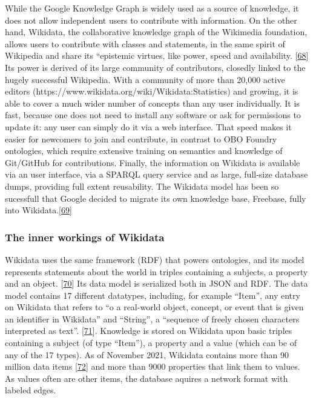 While the Google Knowledge Graph is widely used as a source of knowledge, it does not allow independent users to contribute with information.
On the other hand, Wikidata, the collaborative knowledge graph of the Wikimedia foundation, allows users to contribute with classes and statements, in the same spirit of Wikipedia and share its ``epistemic virtues, like power, speed and availability. {[}\protect\hyperlink{ref-qMozvNth}{68}{]}
Its power is derived of its large community of contributors, closedly linked to the hugely successful Wikipedia.
With a community of more than 20,000 active editors (https://www.wikidata.org/wiki/Wikidata:Statistics) and growing, it is able to cover a much wider number of concepts than any user individually.
It is fast, because one does not need to install any software or ask for permissions to update it: any user can simply do it via a web interface.
That speed makes it easier for newcomers to join and contribute, in contrast to OBO Foundry ontologies, which require extensive training on semantics and knowledge of Git/GitHub for contributions.
Finally, the information on Wikidata is available via an user interface, via a SPARQL query service and as large, full-size database dumps, providing full extent reusability.
The Wikidata model has been so sucessfull that Google decided to migrate its own knowledge base, Freebase, fully into Wikidata.{[}\protect\hyperlink{ref-xLpRePoh}{69}{]}

\hypertarget{the-inner-workings-of-wikidata}{%
\subsubsection{The inner workings of Wikidata}\label{the-inner-workings-of-wikidata}}

Wikidata uses the same framework (RDF) that powers ontologies, and its model represents statements about the world in triples containing a subjects, a property and an object. {[}\protect\hyperlink{ref-Ea6hVYrD}{70}{]}
Its data model is serialized both in JSON and RDF.
The data model contains 17 different datatypes, including, for example ``Item'', any entry on Wikidata that refers to ``o a real-world object, concept, or event that is given an identifier in Wikidata'' and ``String'', a ``sequence of freely chosen characters interpreted as text''. {[}\protect\hyperlink{ref-17Yt10yrY}{71}{]}.
Knowledge is stored on Wikidata upon basic triples containing a subject (of type ``Item''), a property and a value (which can be of any of the 17 types).
As of November 2021, Wikidata contains more than 90 million data items {[}\protect\hyperlink{ref-SGzjBOG0}{72}{]} and more than 9000 properties that link them to values.
As values often are other items, the database aquires a network format with labeled edges.

